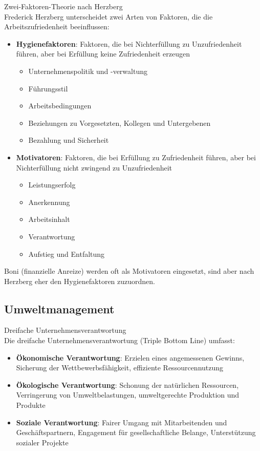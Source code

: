\begin{concept}{Zwei-Faktoren-Theorie nach Herzberg}\\
Frederick Herzberg unterscheidet zwei Arten von Faktoren, die die Arbeitszufriedenheit beeinflussen:
\begin{itemize}
    \item \textbf{Hygienefaktoren}: Faktoren, die bei Nichterfüllung zu Unzufriedenheit führen, aber bei Erfüllung keine Zufriedenheit erzeugen
    \begin{itemize}
        \item Unternehmenspolitik und -verwaltung
        \item Führungsstil
        \item Arbeitsbedingungen
        \item Beziehungen zu Vorgesetzten, Kollegen und Untergebenen
        \item Bezahlung und Sicherheit
    \end{itemize}
    \item \textbf{Motivatoren}: Faktoren, die bei Erfüllung zu Zufriedenheit führen, aber bei Nichterfüllung nicht zwingend zu Unzufriedenheit
    \begin{itemize}
        \item Leistungserfolg
        \item Anerkennung
        \item Arbeitsinhalt
        \item Verantwortung
        \item Aufstieg und Entfaltung
    \end{itemize}
\end{itemize}

Boni (finanzielle Anreize) werden oft als Motivatoren eingesetzt, sind aber nach Herzberg eher den Hygienefaktoren zuzuordnen.
\end{concept}

\subsection{Umweltmanagement}

\begin{concept}{Dreifache Unternehmensverantwortung}\\
Die dreifache Unternehmensverantwortung (Triple Bottom Line) umfasst:
\begin{itemize}
    \item \textbf{Ökonomische Verantwortung}: Erzielen eines angemessenen Gewinns, Sicherung der Wettbewerbsfähigkeit, effiziente Ressourcennutzung
    \item \textbf{Ökologische Verantwortung}: Schonung der natürlichen Ressourcen, Verringerung von Umweltbelastungen, umweltgerechte Produktion und Produkte
    \item \textbf{Soziale Verantwortung}: Fairer Umgang mit Mitarbeitenden und Geschäftspartnern, Engagement für gesellschaftliche Belange, Unterstützung sozialer Projekte
\end{itemize}
\end{concept}

